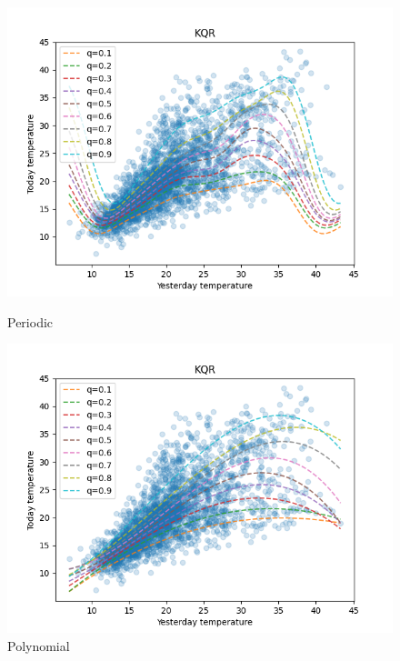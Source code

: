 \begin{figure}[ht]
\begin{minipage}[b]{0.5\linewidth}
      \vspace{4ex}
    \end{minipage}%
    \begin{minipage}[b]{0.5\linewidth}
      \centering
      \includegraphics[width=1.0\textwidth]{images/melbourne_periodic_kernel_quantile_regression.png}
      \caption{Periodic} 
      \vspace{4ex}
    \end{minipage} 
    \begin{minipage}[b]{0.5\linewidth}
      \centering
      \includegraphics[width=1.0\textwidth]{images/melbourne_polynomial_kernel_quantile_regression.png}
        \caption{Polynomial} 
        

\end{minipage}
\end{figure}
